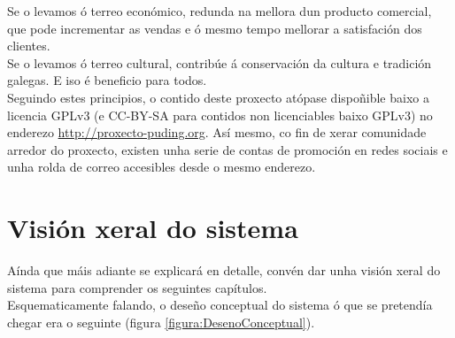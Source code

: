  Se o levamos ó terreo económico, redunda na mellora dun producto comercial,
 que pode incrementar as vendas e ó mesmo tempo mellorar a satisfación dos
 clientes. \\

 Se o levamos ó terreo cultural, contribúe á conservación da cultura e tradición
 galegas. E iso é beneficio para todos. \\

 Seguindo estes principios, o contido deste proxecto atópase dispoñible baixo a
 licencia GPLv3 (e CC-BY-SA para contidos non licenciables baixo GPLv3) no
 enderezo \url{http://proxecto-puding.org}. Así mesmo, co fin de xerar
 comunidade arredor do proxecto, existen unha serie de contas de promoción en
 redes sociais e unha rolda de correo accesibles desde o mesmo enderezo.

\section{Visión xeral do sistema}

 Aínda que máis adiante se explicará en detalle, convén dar unha visión xeral
 do sistema para comprender os seguintes capítulos. \\

 Esquematicamente falando, o deseño conceptual do sistema ó que se pretendía
 chegar era o seguinte (figura \ref{figura:DesenoConceptual}).

